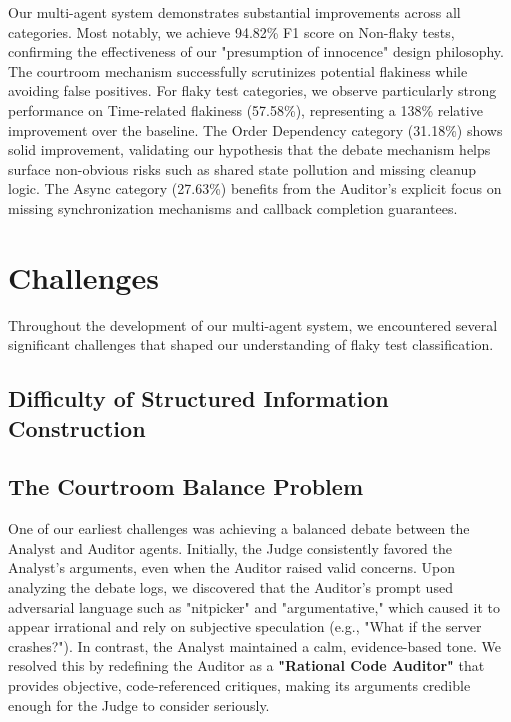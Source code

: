 \documentclass{article}
\begin{document}
Our multi-agent system demonstrates substantial improvements across all categories. Most notably, we achieve 94.82\% F1 score on Non-flaky tests, confirming the effectiveness of our "presumption of innocence" design philosophy. The courtroom mechanism successfully scrutinizes potential flakiness while avoiding false positives. For flaky test categories, we observe particularly strong performance on Time-related flakiness (57.58\%), representing a 138\% relative improvement over the baseline. The Order Dependency category (31.18\%) shows solid improvement, validating our hypothesis that the debate mechanism helps surface non-obvious risks such as shared state pollution and missing cleanup logic. The Async category (27.63\%) benefits from the Auditor's explicit focus on missing synchronization mechanisms and callback completion guarantees.








\section{Challenges}
Throughout the development of our multi-agent system, we encountered several significant challenges that shaped our understanding of flaky test classification.

\subsection{Difficulty of Structured Information Construction}




\subsection{The Courtroom Balance Problem}

One of our earliest challenges was achieving a balanced debate between the Analyst and Auditor agents. Initially, the Judge consistently favored the Analyst's arguments, even when the Auditor raised valid concerns. Upon analyzing the debate logs, we discovered that the Auditor's prompt used adversarial language such as "nitpicker" and "argumentative," which caused it to appear irrational and rely on subjective speculation (e.g., "What if the server crashes?"). In contrast, the Analyst maintained a calm, evidence-based tone. We resolved this by redefining the Auditor as a \textbf{"Rational Code Auditor"} that provides objective, code-referenced critiques, making its arguments credible enough for the Judge to consider seriously.
\end{document}
